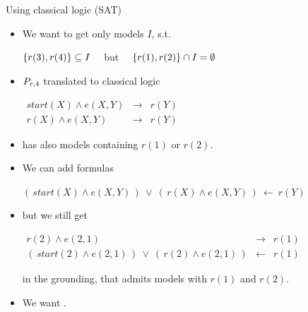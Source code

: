 \documentclass{beamer}
\begin{document}
\begin{frame}{Using classical logic (SAT)}
	\onslide<+->
	
	\begin{itemize}
		\item We want to get only models $I$, s.t.
			\begin{center}
				$\left\{{r(3), r(4)}\right\}\subseteq I\quad$ but $\quad\left\{{r(1), r(2)}\right\}\cap I = \emptyset$
			\end{center}
		
		\onslide<+->
		
		\item $P_{r,4}$ translated to classical logic
			\begin{center}
				$\begin{array}{rcl}
				start(X) \wedge e(X,Y) & \rightarrow & r(Y) \\
				r(X) \wedge e(X,Y) & \rightarrow & r(Y)
				\end{array}$
			\end{center}
		
		\item has also models containing $r(1)$ or $r(2)$.
		
		\onslide<+->
		
		\item We can add formulas
			\begin{center}
				$(\,start(X) \wedge e(X,Y)\,)\ \vee\ (\,r(X) \wedge e(X,Y)\,) \ \leftarrow \ r(Y)$
			\end{center}
		
		\onslide<+->
		
		\item but we still get
			\begin{center}
				$\begin{array}{rcl}
				r(2) \wedge e(2,1) & \rightarrow & r(1) \\
				(\,start(2) \wedge e(2,1)\,)\ \vee\ (\,r(2) \wedge e(2,1)\,) & \leftarrow & r(1)
				\end{array}$
			\end{center}
			in the grounding, that admits models with $r(1)$ and $r(2)$.
		
		\onslide<+->
		
		\item We want .
		
	\end{itemize}
	
\end{frame}
\end{document}
